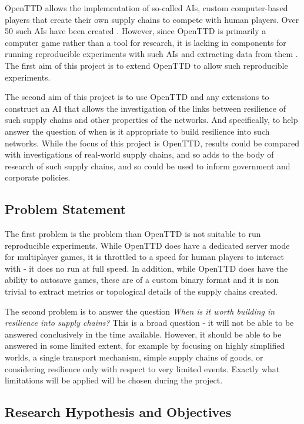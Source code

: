 \documentclass[a4paper,11pt]{article}
\begin{document}
OpenTTD allows the implementation of so-called AIs, custom computer-based players that create their own supply chains to compete with human players. Over 50 such AIs have been created \cite{openttdAIs}. However, since OpenTTD is primarily a computer game rather than a tool for research, it is lacking in components for running reproducible experiments with such AIs and extracting data from them \cite{openttdNoHeadless}. The first aim of this project is to extend OpenTTD to allow such reproducible experiments.

The second aim of this project is to use OpenTTD and any extensions to construct an AI that allows the investigation of the links between resilience of such supply chains and other properties of the networks. And specifically, to help answer the question of when is it appropriate to build resilience into such networks. While the focus of this project is OpenTTD, results could be compared with investigations of real-world supply chains, and so adds to the body of research of such supply chains, and so could be used to inform government and corporate policies.

\subsection{Problem Statement}

The first problem is the problem than OpenTTD is not suitable to run reproducible experiments. While OpenTTD does have a dedicated server mode for multiplayer games, it is throttled to a speed for human players to interact with - it does no run at full speed. In addition, while OpenTTD does have the ability to autosave games, these are of a custom binary format and it is non trivial to extract metrics or topological details of the supply chains created.

The second problem is to answer the question \emph{When is it worth building in resilience into supply chains?} This is a broad question - it will not be able to be answered conclusively in the time available. However, it should be able to be answered in some limited extent, for example by focusing on highly simplified worlds, a single transport mechanism, simple supply chains of goods, or considering resilience only with respect to very limited events. Exactly what limitations will be applied will be chosen during the project.

\subsection{Research Hypothesis and Objectives}
\end{document}

